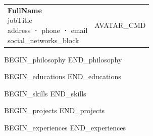 \documentclass{resume}
\begin{document}
\selectfont
\noindent
\begin{tabularx}{\linewidth}{@{}m{} m{}@{}}
{
    \large \textbf{{{FullName}}} \newline
    \small{
        {{jobTitle}} \newline
        {{address}} \textbf{·} {{phone}} \textbf{·} {{email}}
        \newline {{social_networks_block}}
    }
}
&
{
    {{AVATAR_CMD}}
}
\end{tabularx}

{{BEGIN_philosophy}}
{{END_philosophy}}

{{BEGIN_educations}}
{{END_educations}}

{{BEGIN_skills}}
{{END_skills}}

{{BEGIN_projects}}
{{END_projects}}

{{BEGIN_experiences}}
{{END_experiences}}
\end{document}
